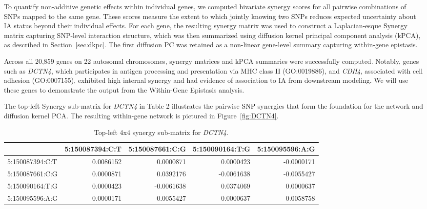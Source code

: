 \documentclass{article}\usepackage[]{graphicx}\usepackage[]{color}
\begin{document}
To quantify non-additive genetic effects within individual genes, we computed bivariate synergy scores for all pairwise combinations of SNPs mapped to the same gene. These scores measure the extent to which jointly knowing two SNPs reduces expected uncertainty about IA status beyond their individual effects. For each gene, the resulting synergy matrix was used to construct a Laplacian-esque Synergy matrix capturing SNP-level interaction structure, which was then summarized using diffusion kernel principal component analysis (kPCA), as described in Section~\ref{sec:dkpc}. The first diffusion PC was retained as a non-linear gene-level summary capturing within-gene epistasis.
\par
Across all 20,859 genes on 22 autosomal chromosomes, synergy matrices and kPCA summaries were successfully computed. Notably, genes such as \textit{DCTN4}, which participates in antigen processing and presentation via MHC class II (GO:0019886), and \textit{CDH4}, associated with cell adhesion (GO:0007155), exhibited high internal synergy and had evidence of association to IA from downstream modeling. We will use these genes to demonstrate the output from the Within-Gene Epistasis analysis.
\par
The top-left Synergy sub-matrix for \textit{DCTN4} in Table 2 illustrates the pairwise SNP synergies that form the foundation for the network and diffusion kernel PCA. The resulting within-gene network is pictured in Figure~\ref{fig:DCTN4}.

\begin{center}
\begin{table}

\caption{Top-left 4x4 synergy sub-matrix for \textit{DCTN4}.}
\centering
\begin{tabular}[t]{l|r|r|r|r}
\hline
  & 5:150087394:C:T & 5:150087661:C:G & 5:150090164:T:G & 5:150095596:A:G\\
\hline
5:150087394:C:T & 0.0086152 & 0.0000871 & 0.0000423 & -0.0000171\\
\hline
5:150087661:C:G & 0.0000871 & 0.0392176 & -0.0061638 & -0.0055427\\
\hline
5:150090164:T:G & 0.0000423 & -0.0061638 & 0.0374069 & 0.0000637\\
\hline
5:150095596:A:G & -0.0000171 & -0.0055427 & 0.0000637 & 0.0058758\\
\hline
\end{tabular}
\end{table}\end{center}
\end{document}
